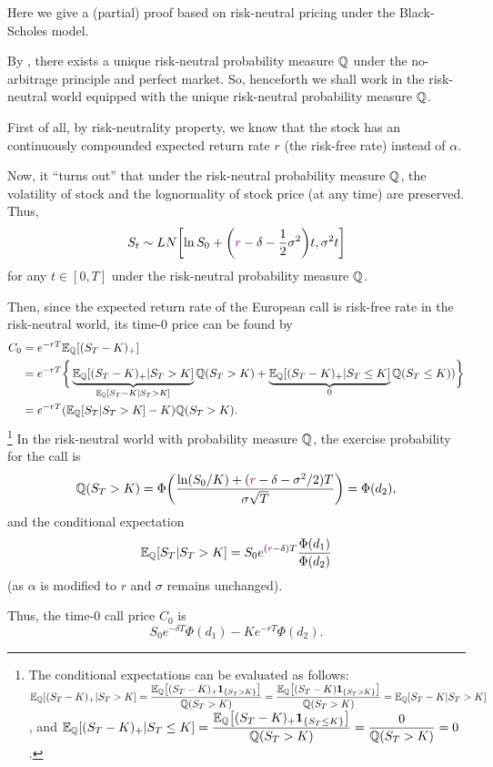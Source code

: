 \begin{enumerate}
\begin{pf}
Here we give a (partial) proof based on risk-neutral pricing under the
Black-Scholes model.

By , there exists a unique risk-neutral
probability measure \(\mathbb{Q}\) under the no-arbitrage principle and perfect market.
So, henceforth we shall work in the risk-neutral world equipped with the unique
risk-neutral probability measure \(\mathbb{Q}\).

First of all, by risk-neutrality property, we know that the stock
 has an continuously compounded expected return rate \(r\)
(the risk-free rate) instead of \(\alpha\).

Now, it ``turns out'' that under the risk-neutral probability measure \(\mathbb{Q}\),
the volatility of stock and the lognormality of stock price (at any time) are
preserved. Thus,
\[
S_t\sim LN\qty[\ln S_0+\qty({\color{violet}r}-\delta-\frac{1}{2}\sigma^2)t,\sigma^2t]
\]
for any \(t\in[0,T]\) under the risk-neutral probability measure \(\mathbb{Q}\).

Then, since the expected return rate of the European call is risk-free rate in
the risk-neutral world, its time-0 price can be found by
\begin{align*}
C_0&=e^{-rT}\mathbb{E}_{\mathbb{Q}}\qty[(S_T-K)_{+}]\\
&=e^{-rT}\bigg\{\underbrace{\mathbb{E}_{\mathbb{Q}}\qty[(S_T-K)_{+}|S_T>K]}_{\mathbb{E}_{\mathbb{Q}}\qty[S_T-K|S_T>K]}\mathbb{Q}\qty(S_T>K)
+\underbrace{\mathbb{E}_{\mathbb{Q}}\qty[(S_T-K)_{+}|S_T\le K]}_{0}\mathbb{Q}\qty(S_T\le K))\bigg\}\\
&=e^{-rT}(\mathbb{E}_{\mathbb{Q}}\qty[S_T|S_T>K]-K)\mathbb{Q}\qty(S_T>K).
\end{align*}
\footnote{The conditional expectations can be evaluated as follows:
\(\displaystyle \mathbb{E}_{\mathbb{Q}}\qty[(S_T-K)_{+}|S_T>K]=\frac{\mathbb{E}_{\mathbb{Q}}\qty[(S_T-K)_{+}\mathbf{1}_{\left\{S_T>K\right\}}]}{\mathbb{Q}\qty(S_T>K)}
=\frac{\mathbb{E}_{\mathbb{Q}}\qty[(S_T-K)\mathbf{1}_{\left\{S_T>K\right\}}]}{\mathbb{Q}\qty(S_T>K)}=\mathbb{E}_{\mathbb{Q}}\qty[S_T-K|S_T>K]
\), and \(\displaystyle \mathbb{E}_{\mathbb{Q}}\qty[(S_T-K)_{+}|S_T\le K]=\frac{\mathbb{E}_{\mathbb{Q}}\qty[(S_T-K)_{+}\mathbf{1}_{\left\{S_T\le K\right\}}]}{\mathbb{Q}\qty(S_T>K)}
=\frac{0}{\mathbb{Q}\qty(S_T>K)}=0\).}
In the risk-neutral world with probability measure \(\mathbb{Q}\), the exercise
probability for the call is
\[
\mathbb{Q}\qty(S_T>K)=\Phi\qty(\frac{\ln(S_0/K)+({\color{violet}r}-\delta-\sigma^2/2)T}{\sigma\sqrt{T}})
=\Phi(d_2),
\]
and the conditional expectation
\[
\mathbb{E}_{\mathbb{Q}}\qty[S_T|S_T>K]=S_0e^{({\color{violet}r}-\delta)T}\frac{\Phi(d_1)}{\Phi(d_2)}
\]
(as \(\alpha\) is modified to \(r\) and \(\sigma\) remains unchanged).

Thus, the time-0 call price \(C_0\) is
\[
S_0e^{-\delta T}\Phi(d_1)-Ke^{-rT}\Phi(d_2).
\]


\end{pf}
\end{enumerate}
